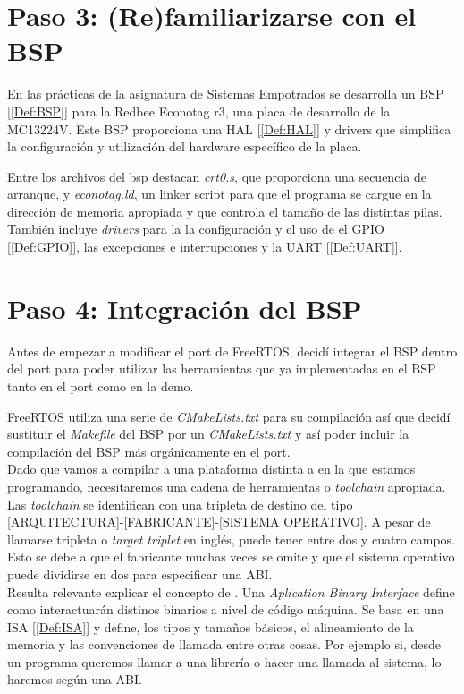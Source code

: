 
\section{Paso 3: (Re)familiarizarse con el BSP}
En las prácticas de la asignatura de Sistemas Empotrados se desarrolla un BSP [\ref{Def:BSP}] para la Redbee Econotag r3, una placa de desarrollo de la MC13224V. Este BSP proporciona una HAL [\ref{Def:HAL}] y drivers que simplifica la configuración y utilización del hardware específico de la placa.

Entre los archivos del bsp destacan \emph{crt0.s}, que proporciona una secuencia de arranque, y \emph{econotag.ld}, un linker script para que el programa se cargue en la dirección de memoria apropiada y que controla el tamaño de las distintas pilas.
También incluye \emph{drivers} para la la configuración y el uso de el GPIO [\ref{Def:GPIO}], las excepciones e interrupciones y la UART [\ref{Def:UART}].

\section{Paso 4: Integración del BSP}
Antes de empezar a modificar el port de FreeRTOS, decidí integrar el BSP dentro del port para poder utilizar las herramientas que ya implementadas en el BSP tanto en el port como en la demo.

FreeRTOS utiliza una serie de \emph{CMakeLists.txt} para su compilación así que decidí sustituir el \emph{Makefile} del BSP por un \emph{CMakeLists.txt} y así poder incluir la compilación del BSP más orgánicamente en el port.\\

Dado que vamos a compilar a una plataforma distinta a en la que estamos programando, necesitaremos una cadena de herramientas o \emph{toolchain} apropiada. Las \emph{toolchain} se identifican con una tripleta de destino del tipo [ARQUITECTURA]-[FABRICANTE]-[SISTEMA OPERATIVO]. A pesar de llamarse tripleta o \emph{target triplet} en inglés, puede tener entre dos y cuatro campos. Esto se debe a que el fabricante muchas veces se omite y que el sistema operativo puede dividirse en dos para especificar una ABI.\\

Resulta relevante explicar el concepto de . Una \emph{Aplication Binary Interface} define como interactuarán distinos binarios a nivel de código máquina. Se basa en una ISA [\ref{Def:ISA}] y define, los tipos y tamaños básicos, el alineamiento de la memoria y las convenciones de llamada entre otras cosas.
Por ejemplo si, desde un programa queremos llamar a una librería o hacer una llamada al sistema, lo haremos según una ABI.\\

